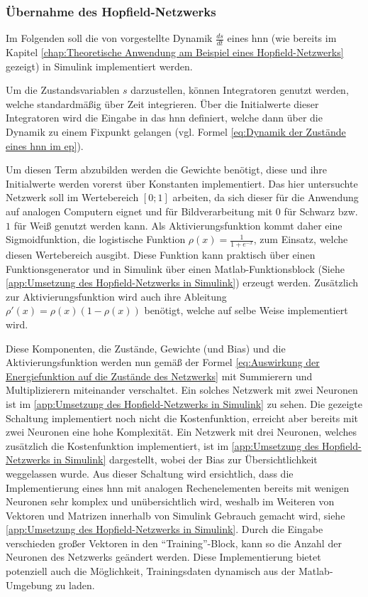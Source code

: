 \subsubsection{Übernahme des Hopfield-Netzwerks}
\label{chap:Übernahme des Hopfield-Netzwerks}

Im Folgenden soll die von \citeauthor{Scellier2017} vorgestellte Dynamik \(\frac{ds}{dt}\) eines \ac{hnn} (wie bereits im Kapitel \ref{chap:Theoretische Anwendung am Beispiel eines Hopfield-Netzwerks} gezeigt) in Simulink implementiert werden.

Um die Zustandsvariablen \(s\) darzustellen, können Integratoren genutzt werden, welche standardmäßig über Zeit integrieren. Über die Initialwerte dieser Integratoren wird die Eingabe in das \ac{hnn} definiert, welche dann über die Dynamik zu einem Fixpunkt gelangen (vgl. Formel \ref{eq:Dynamik der Zustände eines hnn im ep}).

Um diesen Term abzubilden werden die Gewichte benötigt, diese und ihre Initialwerte werden vorerst über Konstanten implementiert. Das hier untersuchte Netzwerk soll im Wertebereich \([0; 1]\) arbeiten, da sich dieser für die Anwendung auf analogen Computern eignet und für \zb Bildverarbeitung mit \(0\) für Schwarz bzw. \(1\) für Weiß genutzt werden kann. Als Aktivierungsfunktion kommt daher eine Sigmoidfunktion, die logistische Funktion \(\rho(x)=\frac{1}{1+e^{-x}}\), zum Einsatz, welche diesen Wertebereich ausgibt. Diese Funktion kann praktisch über einen Funktionsgenerator und in Simulink über einen Matlab-Funktionsblock (Siehe \ref{app:Umsetzung des Hopfield-Netzwerks in Simulink}) erzeugt werden. Zusätzlich zur Aktivierungsfunktion wird auch ihre Ableitung \(\rho'(x)=\rho(x)(1-\rho(x))\) benötigt, welche auf selbe Weise implementiert wird.

Diese Komponenten, die Zustände, Gewichte (und Bias) und die Aktivierungsfunktion werden nun gemäß der Formel \ref{eq:Auswirkung der Energiefunktion auf die Zustände des Netzwerks} mit Summierern und Multiplizierern miteinander verschaltet. Ein solches Netzwerk mit zwei Neuronen ist im \ref{app:Umsetzung des Hopfield-Netzwerks in Simulink} zu sehen. Die gezeigte Schaltung implementiert noch nicht die Kostenfunktion, erreicht aber bereits mit zwei Neuronen eine hohe Komplexität. Ein Netzwerk mit drei Neuronen, welches zusätzlich die Kostenfunktion implementiert, ist im \ref{app:Umsetzung des Hopfield-Netzwerks in Simulink} dargestellt, wobei der Bias zur Übersichtlichkeit weggelassen wurde. Aus dieser Schaltung wird ersichtlich, dass die Implementierung eines \ac{hnn} mit analogen Rechenelementen bereits mit wenigen Neuronen sehr komplex und unübersichtlich wird, weshalb im Weiteren von Vektoren und Matrizen innerhalb von Simulink Gebrauch gemacht wird, siehe \ref{app:Umsetzung des Hopfield-Netzwerks in Simulink}. Durch die Eingabe verschieden großer Vektoren in den "`Training"'-Block, kann so die Anzahl der Neuronen des Netzwerks geändert werden. Diese Implementierung bietet potenziell auch die Möglichkeit, Trainingsdaten dynamisch aus der Matlab-Umgebung zu laden.
